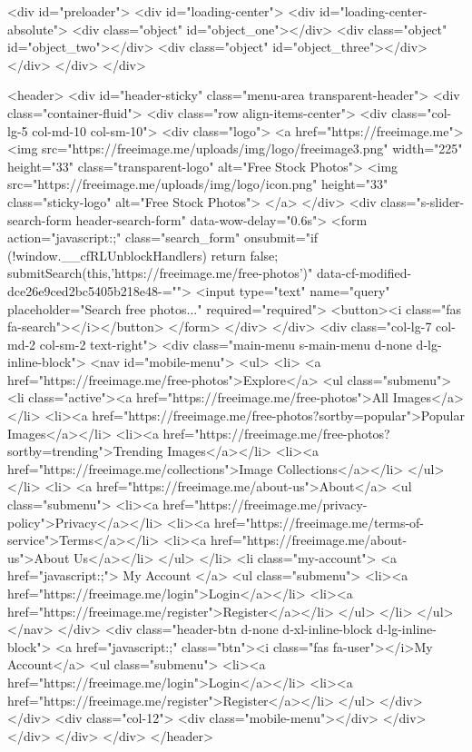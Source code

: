 <div id="preloader">
<div id="loading-center">
<div id="loading-center-absolute">
<div class="object" id="object_one"></div>
<div class="object" id="object_two"></div>
<div class="object" id="object_three"></div>
</div>
</div>
</div>


<header>
<div id="header-sticky" class="menu-area transparent-header">
 <div class="container-fluid">
<div class="row align-items-center">
<div class="col-lg-5 col-md-10 col-sm-10">
<div class="logo">
<a href="https://freeimage.me">
<img src="https://freeimage.me/uploads/img/logo/freeimage3.png" width="225" height="33" class="transparent-logo" alt="Free Stock Photos">
<img src="https://freeimage.me/uploads/img/logo/icon.png" height="33" class="sticky-logo" alt="Free Stock Photos">
</a>
</div>
<div class="s-slider-search-form header-search-form" data-wow-delay="0.6s">
<form action="javascript:;" class="search_form" onsubmit="if (!window.__cfRLUnblockHandlers) return false; submitSearch(this,'https://freeimage.me/free-photos')" data-cf-modified-dce26e9ced2bc5405b218e48-="">
<input type="text" name="query" placeholder="Search free photos..." required="required">
<button><i class="fas fa-search"></i></button>
</form>
</div>
</div>
<div class="col-lg-7 col-md-2 col-sm-2 text-right">
<div class="main-menu s-main-menu d-none d-lg-inline-block">
<nav id="mobile-menu">
<ul>
<li>
<a href="https://freeimage.me/free-photos">Explore</a>
<ul class="submenu">
<li class="active"><a href="https://freeimage.me/free-photos">All Images</a></li>
<li><a href="https://freeimage.me/free-photos?sortby=popular">Popular Images</a></li>
<li><a href="https://freeimage.me/free-photos?sortby=trending">Trending Images</a></li>
<li><a href="https://freeimage.me/collections">Image Collections</a></li>
</ul>
</li>
<li>
<a href="https://freeimage.me/about-us">About</a>
<ul class="submenu">
<li><a href="https://freeimage.me/privacy-policy">Privacy</a></li>
<li><a href="https://freeimage.me/terms-of-service">Terms</a></li>
<li><a href="https://freeimage.me/about-us">About Us</a></li>
</ul>
</li>
<li class="my-account">
<a href="javascript:;">
My Account
</a>
<ul class="submenu">
<li><a href="https://freeimage.me/login">Login</a></li>
<li><a href="https://freeimage.me/register">Register</a></li>
</ul>
</li>
</ul>
</nav>
</div>
<div class="header-btn d-none d-xl-inline-block d-lg-inline-block">
<a href="javascript:;" class="btn"><i class="fas fa-user"></i>My Account</a>
<ul class="submenu">
<li><a href="https://freeimage.me/login">Login</a></li>
<li><a href="https://freeimage.me/register">Register</a></li>
</ul>
</div>
</div>
<div class="col-12">
<div class="mobile-menu"></div>
</div>
</div>
</div>
</div>
</header> 

